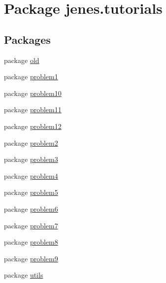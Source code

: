 \hypertarget{namespacejenes_1_1tutorials}{\section{Package jenes.\-tutorials}
\label{namespacejenes_1_1tutorials}
}
\subsection*{Packages}
\begin{DoxyCompactItemize}
\item 
package \hyperlink{namespacejenes_1_1tutorials_1_1old}{old}
\item 
package \hyperlink{namespacejenes_1_1tutorials_1_1problem1}{problem1}
\item 
package \hyperlink{namespacejenes_1_1tutorials_1_1problem10}{problem10}
\item 
package \hyperlink{namespacejenes_1_1tutorials_1_1problem11}{problem11}
\item 
package \hyperlink{namespacejenes_1_1tutorials_1_1problem12}{problem12}
\item 
package \hyperlink{namespacejenes_1_1tutorials_1_1problem2}{problem2}
\item 
package \hyperlink{namespacejenes_1_1tutorials_1_1problem3}{problem3}
\item 
package \hyperlink{namespacejenes_1_1tutorials_1_1problem4}{problem4}
\item 
package \hyperlink{namespacejenes_1_1tutorials_1_1problem5}{problem5}
\item 
package \hyperlink{namespacejenes_1_1tutorials_1_1problem6}{problem6}
\item 
package \hyperlink{namespacejenes_1_1tutorials_1_1problem7}{problem7}
\item 
package \hyperlink{namespacejenes_1_1tutorials_1_1problem8}{problem8}
\item 
package \hyperlink{namespacejenes_1_1tutorials_1_1problem9}{problem9}
\item 
package \hyperlink{namespacejenes_1_1tutorials_1_1utils}{utils}
\end{DoxyCompactItemize}
